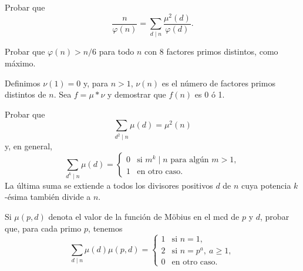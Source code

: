 \documentclass[12pt,a4paper]{book}
\begin{document}
    \begin{ejercicio}
        Probar que
        \begin{equation*}
            \frac{n}{\varphi(n)}=\sum_{d\mid n}\frac{\mu^2(d)}{\varphi(d)}.
        \end{equation*}
    \end{ejercicio}

    \begin{ejercicio}
        Probar que $\varphi(n)>n/6$ para todo $n$ con 8 factores primos distintos, como
        máximo.
    \end{ejercicio}

    \begin{ejercicio}
        Definimos $\nu(1)=0$ y, para $n>1$, $\nu(n)$ es el número de factores primos
        distintos de $n$. Sea $f=\mu*\nu$ y demostrar que $f(n)$ es 0 ó 1.
    \end{ejercicio}

    \begin{ejercicio}
        Probar que
        \begin{equation*}
            \sum_{d^2\mid n}\mu(d)=\mu^2(n)
        \end{equation*}
        y, en general,
        \begin{equation*}
            \sum_{d^k\mid n}\mu(d)=
            \begin{cases}
                0 & \text{si } m^k\mid n \text{ para algún } m>1,\\
                1 & \text{en otro caso.}
            \end{cases}
        \end{equation*}
        La última suma se extiende a todos los divisores positivos $d$ de $n$ cuya potencia
        $k$-ésima también divide a $n$.
    \end{ejercicio}

    \begin{ejercicio}
        Si $\mu(p,d)$ denota el valor de la función de Möbius en el mcd de $p$ y $d$,
        probar que, para cada primo $p$, tenemos
        \begin{equation*}
            \sum_{d\mid n}\mu(d)\mu(p,d)=
            \begin{cases}
                1 & \text{si } n=1,\\
                2 & \text{si } n=p^a,\ a\geq1,\\
                0 & \text{en otro caso.}
            \end{cases}
        \end{equation*}
    \end{ejercicio}
\end{document}
